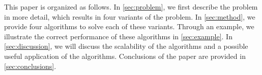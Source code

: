 This paper is organized as follows.
In \cref{sec:problem}, we first describe the problem in more detail, which results in four variants of the problem.
In \cref{sec:method}, we provide four algorithms to solve each of these variants.
Through an example, we illustrate the correct performance of these algorithms in \cref{sec:example}.
In \cref{sec:discussion}, we will discuss the scalability of the algorithms and a possible useful application of the algorithms. 
Conclusions of the paper are provided in \cref{sec:conclusions}.
